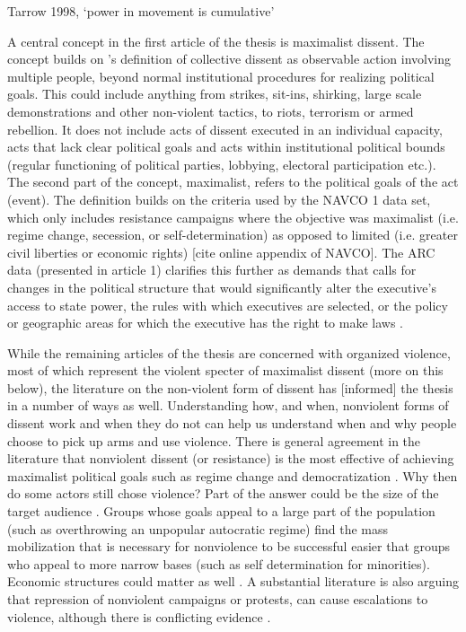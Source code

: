 \documentclass[12pt]{article}
\begin{document}
Tarrow 1998, `power in movement is cumulative'

A central concept in the first article of the thesis is maximalist dissent. The
concept builds on \citet{TillyCharles1978Fmtr}'s definition of collective
dissent as observable action involving multiple people, beyond normal
institutional procedures for realizing political goals. This could include
anything from strikes, sit-ins, shirking, large scale demonstrations and other
non-violent tactics, to riots, terrorism or armed rebellion. It does not include
acts of dissent executed in an individual capacity, acts that lack clear
political goals and acts within institutional political bounds (regular
functioning of political parties, lobbying, electoral participation etc.). The
second part of the concept, maximalist, refers to the political goals of the act
(event). The definition builds on the criteria used by the NAVCO 1 data set,
which only includes resistance campaigns where the objective was maximalist
(i.e. regime change, secession, or self-determination) as opposed to limited
(i.e. greater civil liberties or economic rights) [cite online appendix of
NAVCO]. The ARC data (presented in article 1) clarifies this further as demands
that calls for changes in the political structure that would significantly alter
the executive’s access to state power, the rules with which executives are
selected, or the policy or geographic areas for which the executive has the
right to make laws \citep{Butcher_2022}.

While the remaining articles of the thesis are concerned with organized
violence, most of which represent the violent specter of maximalist dissent
(more on this below), the literature on the non-violent form of dissent has
[informed] the thesis in a number of ways as well. Understanding how, and when,
nonviolent forms of dissent work and when they do not can help us understand
when and why people choose to pick up arms and use violence. There is general
agreement in the literature that nonviolent dissent (or resistance) is the most
effective of achieving maximalist political goals \citep{chenoweth2011civil,
Stephan_2008} such as regime change and democratization \citep{Celestino_2013,
Bethke_2019}. Why then do some actors still chose violence? Part of the answer
could be the size of the target audience \citep{Gleditsch_2021}. Groups whose
goals appeal to a large part of the population (such as overthrowing an
unpopular autocratic regime) find the mass mobilization that is necessary for
nonviolence to be successful easier that groups who appeal to more narrow bases
(such as self determination for minorities)\citep{Gleditsch_2021}. Economic
structures could matter as well \citep{Butcher_2014}. A substantial literature
is also arguing that repression of nonviolent campaigns or protests, can cause
escalations to violence, although there is conflicting evidence
\citep{Chenoweth_2017, Lichbach_1987}.
\end{document}
